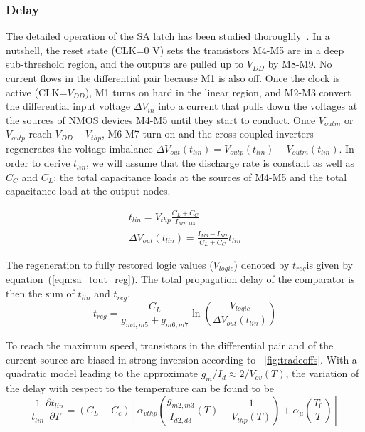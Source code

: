 \subsubsection{Delay}
The detailed operation of the SA latch has been studied thoroughly~\cite{Wicht2004, Razavi2015}.
In a nutshell, the reset state (CLK=0 V) sets the transistors M4-M5 are in a deep sub-threshold region, and the outputs are pulled up to \(V_{DD}\) by M8-M9. No current flows in the differential pair because M1 is also off.
Once the clock is active (CLK=\(V_{DD}\)), M1 turns on hard in the linear region, and M2-M3 convert the differential input voltage \(\Delta V_{in}\) into a current that pulls down the voltages at the sources of NMOS devices M4-M5 until they start to conduct.
Once \(V_{outm}\) or \(V_{outp}\) reach \(V_{DD}-V_{thp}\), M6-M7 turn on and the cross-coupled inverters regenerates the voltage imbalance \(\Delta V_{out}(t_{lin}) = V_{outp}(t_{lin}) - V_{outm}(t_{lin})\). In order to derive \(t_{lin}\), we will assume that the discharge rate is constant as well as \(C_{C}\) and \(C_{L}\): the total capacitance loads at the sources of M4-M5 and the total capacitance load at the output nodes.

\begin{eqnarray}
\label{eq:sa_tout_lin}
t_{lin} = V_{thp}\frac{{C_{L}+C_C}}{I_{M2,M3}}   \\
\Delta V_{out}(t_{lin}) = \frac{I_{M3}-I_{M2}}{{C_{L}+C_C}}t_{lin}  \label{eq:sa_dout_lin}
\end{eqnarray}

The regeneration to fully restored logic values (\(V_{logic}\)) denoted by \(t_{reg}\)is given by equation~(\ref{eqn:sa_tout_reg}). The total propagation delay of the comparator is then the sum of \(t_{lin}\) and \(t_{reg}\).
\begin{equation}
    \label{eqn:sa_tout_reg}
t_{reg} = \frac{C_{L}}{g_{m4,m5}+g_{m6,m7}} \ln{\left(\frac{V_{logic}}{\Delta V_{out}(t_{lin})}\right)}
\end{equation}

To reach the maximum speed, transistors in the differential pair and of the current source are biased in strong inversion according to \figurename~\ref{fig:tradeoffs}. With a quadratic model leading to the approximate \(g_m/I_d \approx 2/V_{ov}(T)\), the variation of the delay with respect to the temperature can be found to be 
\begin{equation}
\label{eqn:sa_dt_dT}
\frac{1}{t_{lin}}\frac{\partial t_{lin}}{\partial T} = (C_L+C_c) \left[ \alpha_{vthp} \left(\frac{g_{m2,m3}}{I_{d2,d3}}(T) - \frac{1}{V_{thp}(T)} \right) + \alpha_\mu \left(\frac{T_0}{T} \right) \right]
\end{equation}


